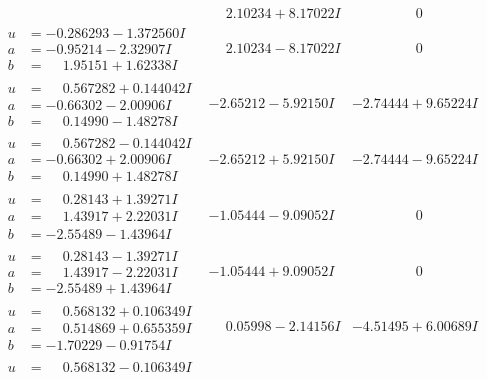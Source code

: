 \documentclass[1p]{elsarticle_modified}
\theoremstyle{definition}
\begin{document}
$$\begin{array}{c|c|c}
 & \phantom{-}2.10234 + 8.17022 I & \phantom{-0.000000 } 0 \\ \hline\begin{aligned}
u &= -0.286293 - 1.372560 I \\
a &= -0.95214 - 2.32907 I \\
b &= \phantom{-}1.95151 + 1.62338 I\end{aligned}
 & \phantom{-}2.10234 - 8.17022 I & \phantom{-0.000000 } 0 \\ \hline\begin{aligned}
u &= \phantom{-}0.567282 + 0.144042 I \\
a &= -0.66302 - 2.00906 I \\
b &= \phantom{-}0.14990 - 1.48278 I\end{aligned}
 & -2.65212 - 5.92150 I & -2.74444 + 9.65224 I \\ \hline\begin{aligned}
u &= \phantom{-}0.567282 - 0.144042 I \\
a &= -0.66302 + 2.00906 I \\
b &= \phantom{-}0.14990 + 1.48278 I\end{aligned}
 & -2.65212 + 5.92150 I & -2.74444 - 9.65224 I \\ \hline\begin{aligned}
u &= \phantom{-}0.28143 + 1.39271 I \\
a &= \phantom{-}1.43917 + 2.22031 I \\
b &= -2.55489 - 1.43964 I\end{aligned}
 & -1.05444 - 9.09052 I & \phantom{-0.000000 } 0 \\ \hline\begin{aligned}
u &= \phantom{-}0.28143 - 1.39271 I \\
a &= \phantom{-}1.43917 - 2.22031 I \\
b &= -2.55489 + 1.43964 I\end{aligned}
 & -1.05444 + 9.09052 I & \phantom{-0.000000 } 0 \\ \hline\begin{aligned}
u &= \phantom{-}0.568132 + 0.106349 I \\
a &= \phantom{-}0.514869 + 0.655359 I \\
b &= -1.70229 - 0.91754 I\end{aligned}
 & \phantom{-}0.05998 - 2.14156 I & -4.51495 + 6.00689 I \\ \hline\begin{aligned}
u &= \phantom{-}0.568132 - 0.106349 I \\

\end{aligned}
\end{array}$$
\end{document}
